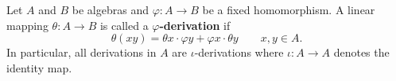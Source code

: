 Let $A$ and $B$ be algebras and $\varphi: A \to B$ be a fixed homomorphism. A linear mapping $\theta: A \to B$ is called a \textbf{$\varphi$-derivation} if
$$
\theta(xy) = \theta x \cdot \varphi y + \varphi x \cdot \theta y \qquad x, y \in A.
$$
In particular, all derivations in $A$ are $\iota$-derivations where $\iota: A \to A$ denotes the identity map.
